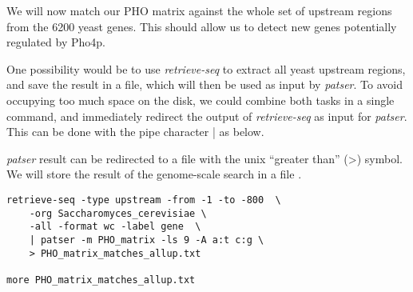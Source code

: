 We will now match our PHO matrix against the whole set of upstream
regions from the 6200 yeast genes. This should allow us to detect new
genes potentially regulated by Pho4p.

One possibility would be to use \textit{retrieve-seq} to extract all
yeast upstream regions, and save the result in a file, which will then
be used as input by \textit{patser}. To avoid occupying too much space
on the disk, we could combine both tasks in a single command, and
immediately redirect the output of \textit{retrieve-seq} as input for
\textit{patser}. This can be done with the pipe character | as
below.

\textit{patser} result can be redirected to a file with the unix
``greater than'' (>) symbol. We will store the result of the
genome-scale search in a file .

\begin{verbatim}
retrieve-seq -type upstream -from -1 -to -800  \
    -org Saccharomyces_cerevisiae \
    -all -format wc -label gene  \
    | patser -m PHO_matrix -ls 9 -A a:t c:g \
    > PHO_matrix_matches_allup.txt

more PHO_matrix_matches_allup.txt
\end{verbatim}
